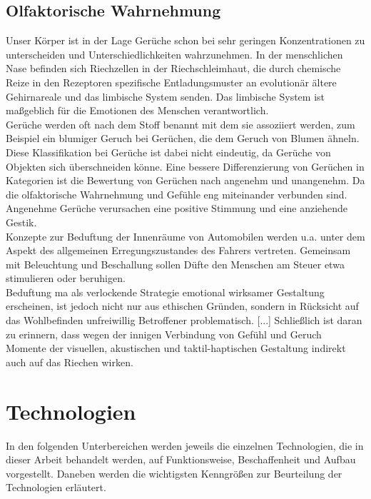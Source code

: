 \subsection{Olfaktorische Wahrnehmung}
Unser Körper ist in der Lage Gerüche schon bei sehr geringen Konzentrationen zu unterscheiden und Unterschiedlichkeiten wahrzunehmen. In der menschlichen Nase befinden sich Riechzellen in der Riechschleimhaut, die durch chemische Reize in den Rezeptoren spezifische Entladungsmuster an evolutionär ältere Gehirnareale und das limbische System senden. Das limbische System ist maßgeblich für die Emotionen des Menschen verantwortlich. \cite[Vgl. Seite 102]{Schonhammer.2013}\\
Gerüche werden oft nach dem Stoff benannt mit dem sie assoziiert werden, zum Beispiel ein blumiger Geruch bei Gerüchen, die dem Geruch von Blumen ähneln. Diese Klassifikation bei Gerüche ist dabei nicht eindeutig, da Gerüche von Objekten sich überschneiden könne. Eine bessere Differenzierung von Gerüchen in Kategorien ist die Bewertung von Gerüchen nach angenehm und unangenehm. Da die olfaktorische Wahrnehmung und Gefühle eng miteinander verbunden sind. Angenehme Gerüche verursachen eine positive Stimmung und eine anziehende Gestik. \cite[Vgl. Seite 105f]{Schonhammer.2013}\\
\glqq Konzepte zur Beduftung der Innenräume von Automobilen werden u.a. unter dem Aspekt des allgemeinen Erregungszustandes des Fahrers vertreten. Gemeinsam mit Beleuchtung und Beschallung sollen Düfte den Menschen am Steuer etwa stimulieren oder beruhigen.\grqq{} \cite[Seite 122f]{Schonhammer.2013}\\
\glqq Beduftung ma als verlockende Strategie emotional wirksamer Gestaltung erscheinen, ist jedoch nicht nur aus ethischen Gründen, sondern in Rücksicht auf das Wohlbefinden unfreiwillig Betroffener problematisch. [...] Schließlich ist daran zu erinnern, dass wegen der innigen Verbindung von Gefühl und Geruch Momente der visuellen, akustischen und taktil-haptischen Gestaltung indirekt auch auf das Riechen wirken. \grqq{} \cite[Seite 123]{Schonhammer.2013}
\section{Technologien}
In den folgenden Unterbereichen werden jeweils die einzelnen Technologien, die in dieser Arbeit behandelt werden, auf Funktionsweise, Beschaffenheit und Aufbau vorgestellt. Daneben werden die wichtigsten Kenngrößen zur Beurteilung der Technologien erläutert.
